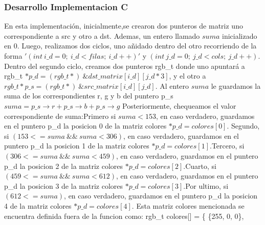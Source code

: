 \vspace*{0.3cm} \noindent
\subsubsection{Desarrollo Implementacion C}

En esta implementación, inicialmente,se crearon dos punteros de matriz uno correspondiente a src y otro a dst.\newline 
Ademas, un entero llamado $suma$ inicializado en 0. \newline
Luego, realizamos dos ciclos, uno añidado dentro del otro recorriendo de la forma $'(int\ i\_d = 0;\ i\_d < filas;\ i\_d++)'$ y 
$(int\ j\_d = 0;\ j\_d < cols;\ j\_d++)$.\newline
Dentro del segundo ciclo, creamos dos punteros rgb\_t donde uno apuntará a \newline rgb\_t $*p\_d = (rgb\_t*)\  \&dst\_matrix[i\_d][j\_d*3]$, y el otro
a $rgb\_t *p\_s = (rgb\_t*)\ \&src\_matrix[i\_d][j\_d]$.\newline
Al entero $suma$ le guardamos la suma de los correspondientes r, g y b del puntero p\_s $suma = p\_s\rightarrow r + p\_s\rightarrow b + p\_s\rightarrow g$ \newline
Posteriormente, chequeamos el valor correspondiente de suma:\newline Primero si $suma < 153$, en caso verdadero, guardamos en el puntero p\_d la posicion 0 de la matriz colores
$*p\_d = colores[0]$. \newline Segundo, si $(153 <= suma \  \&\& \ suma < 306)$, en caso verdadero, guardamos en el puntero p\_d la posicion 1 de la matriz colores
$*p\_d = colores[1]$.\newline Tercero, si $(306 <= suma \  \&\& \  suma < 459)$, en caso verdadero, guardamos en el puntero p\_d la posicion 2 de la matriz colores
$*p\_d = colores[2]$.\newline Cuarto, si $(459 <= suma \  \&\& \  suma < 612)$, en caso verdadero, guardamos en el puntero p\_d la posicion 3 de la matriz colores
$*p\_d = colores[3]$.\newline Por ultimo, si $(612 <= suma)$, en caso verdadero, guardamos en el puntero p\_d la posicion 4 de la matriz colores
$*p\_d = colores[4]$.\newline
Esta matriz colores mencionada se encuentra definida fuera de la funcion como:\newline \noindent
rgb\_t colores[] =  \{ \{255,   0,   0\},\newline
